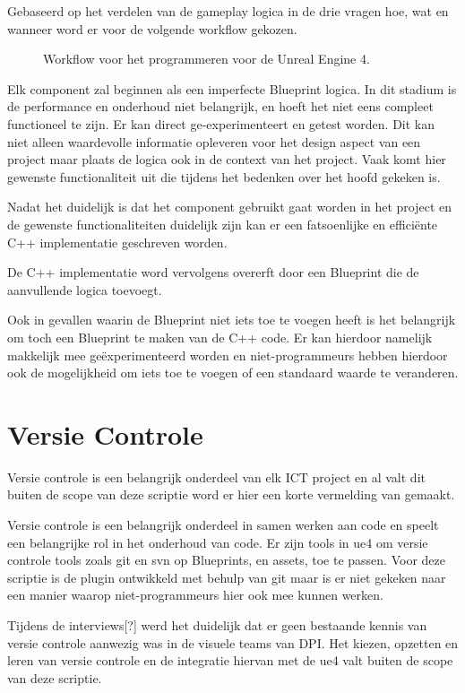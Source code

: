 Gebaseerd op het verdelen van de gameplay logica in de drie vragen hoe, wat en wanneer word er voor de volgende workflow gekozen.
    
\begin{figure}
	\centering
		\caption{Workflow voor het programmeren voor de Unreal Engine 4.}
\end{figure}

Elk component zal beginnen als een imperfecte Blueprint logica. In dit stadium is de performance en onderhoud niet belangrijk, en hoeft het niet eens compleet functioneel te zijn. Er kan direct ge-experimenteert en getest worden. Dit kan niet alleen waardevolle informatie opleveren voor het design aspect van een project maar plaats de logica ook in de context van het project. Vaak komt hier gewenste functionaliteit uit die tijdens het bedenken over het hoofd gekeken is.

Nadat het duidelijk is dat het component gebruikt gaat worden in het project en de gewenste functionaliteiten duidelijk zijn kan er een fatsoenlijke en efficiënte C++ implementatie geschreven worden.

De C++ implementatie word vervolgens overerft door een Blueprint die de aanvullende logica toevoegt.

Ook in gevallen waarin de Blueprint niet iets toe te voegen heeft is het belangrijk om toch een Blueprint te maken van de C++ code. Er kan hierdoor namelijk makkelijk mee geëxperimenteerd worden en niet-programmeurs hebben hierdoor ook de mogelijkheid om iets toe te voegen of een standaard waarde te veranderen.

\section{Versie Controle}
Versie controle is een belangrijk onderdeel van elk ICT project en al valt dit buiten de scope van deze scriptie word er hier een korte vermelding van gemaakt.

Versie controle is een belangrijk onderdeel in samen werken aan code en speelt een belangrijke rol in het onderhoud van code. Er zijn tools in \gls{ue4} om versie controle tools zoals git en svn op Blueprints, en assets, toe te passen. Voor deze scriptie is de plugin ontwikkeld met behulp van git maar is er niet gekeken naar een manier waarop niet-programmeurs hier ook mee kunnen werken.

Tijdens de interviews[?] werd het duidelijk dat er geen bestaande kennis van versie controle aanwezig was in de visuele teams van DPI. Het kiezen, opzetten en leren van versie controle en de integratie hiervan met de \gls{ue4} valt buiten de scope van deze scriptie.